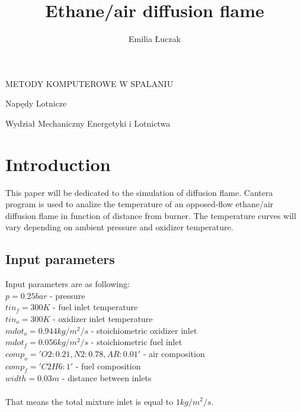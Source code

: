\documentclass[a4paper]{article}
\title{Ethane/air diffusion flame}
\author{Emilia Łuczak}
\date{}
\newcommand{\sepspace}{\vspace*{1em}}
\begin{document}
\maketitle
\sepspace
 \begin{centering}
 METODY KOMPUTEROWE W SPALANIU\\
 \end{centering}
 \sepspace
 \sepspace
 \sepspace
 \sepspace
 \sepspace
 \sepspace
 \sepspace
 \sepspace
 \sepspace
 \sepspace
 \sepspace
 \sepspace
 \sepspace
 \sepspace
 \sepspace
 \sepspace
 \sepspace
 \sepspace
 \sepspace
 \sepspace
 \sepspace
 \sepspace
 \sepspace
 \sepspace
 \sepspace
 \sepspace
 \sepspace
 \sepspace
 \sepspace
 \sepspace
 \sepspace
 \sepspace
 \sepspace
 \sepspace
 \sepspace
 \sepspace
 \sepspace
 \sepspace
 \sepspace
 \sepspace
 \sepspace
 \sepspace
 \sepspace
 \sepspace
 \sepspace
 
 
 \begin{centering}
 Napędy Lotnicze\\
 \end{centering}
 \begin{centering}
 Wydział Mechaniczny Energetyki i Lotnictwa\\
 \end{centering}


\pagebreak
\section{Introduction}

This paper will be dedicated to the simulation of diffusion flame. Cantera program is used to analize the temperature of an opposed-flow ethane/air diffusion flame in function of distance from burner. The temperature curves will vary depending on ambient pressure and oxidizer temperature. \\
\subsection{Input parameters}
Input parameters are as following:\\
$p = 0.25 bar$ - pressure\\
$tin_f = 300 K$ - fuel inlet temperature\\
$tin_o = 300 K$  - oxidizer inlet temperature\\
$mdot_o = 0.944 kg/m^2/s$ - stoichiometric oxidizer inlet\\
$mdot_f = 0.056 kg/m^2/s$ - stoichiometric fuel inlet \\
$comp_o = 'O2:0.21, N2:0.78, AR:0.01'$  - air composition\\
$comp_f = 'C2H6:1'$  - fuel composition\\
$width = 0.03 m$ - distance between inlets\\
\\
That means the total mixture inlet is equal to $1 kg/m^2/s$.
\\
\end{document}
